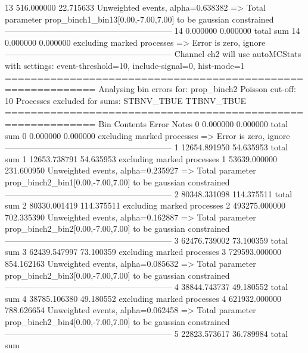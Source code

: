 13         516.000000      22.715633       Unweighted events, alpha=0.638382
  => Total parameter prop_binch1_bin13[0.00,-7.00,7.00] to be gaussian constrained
------------------------------------------------------------
14         0.000000        0.000000        total sum                     
14         0.000000        0.000000        excluding marked processes    
  => Error is zero, ignore      
------------------------------------------------------------
Channel ch2 will use autoMCStats with settings: event-threshold=10, include-signal=0, hist-mode=1
============================================================
Analysing bin errors for: prop_binch2
Poisson cut-off: 10
Processes excluded for sums: STBNV_TBUE TTBNV_TBUE
============================================================
Bin        Contents        Error           Notes                         
0          0.000000        0.000000        total sum                     
0          0.000000        0.000000        excluding marked processes    
  => Error is zero, ignore      
------------------------------------------------------------
1          12654.891950    54.635953       total sum                     
1          12653.738791    54.635953       excluding marked processes    
1          53639.000000    231.600950      Unweighted events, alpha=0.235927
  => Total parameter prop_binch2_bin1[0.00,-7.00,7.00] to be gaussian constrained
------------------------------------------------------------
2          80348.331098    114.375511      total sum                     
2          80330.001419    114.375511      excluding marked processes    
2          493275.000000   702.335390      Unweighted events, alpha=0.162887
  => Total parameter prop_binch2_bin2[0.00,-7.00,7.00] to be gaussian constrained
------------------------------------------------------------
3          62476.739002    73.100359       total sum                     
3          62439.547997    73.100359       excluding marked processes    
3          729593.000000   854.162163      Unweighted events, alpha=0.085632
  => Total parameter prop_binch2_bin3[0.00,-7.00,7.00] to be gaussian constrained
------------------------------------------------------------
4          38844.743737    49.180552       total sum                     
4          38785.106380    49.180552       excluding marked processes    
4          621932.000000   788.626654      Unweighted events, alpha=0.062458
  => Total parameter prop_binch2_bin4[0.00,-7.00,7.00] to be gaussian constrained
------------------------------------------------------------
5          22823.573617    36.789984       total sum                     

